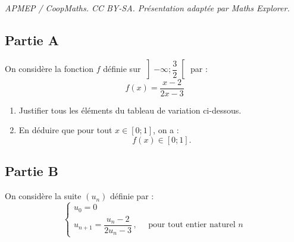\documentclass[10pt]{article}
\begin{document}
\noindent\textit{APMEP / CoopMaths. CC BY-SA. Présentation adaptée par Maths Explorer.}\par\medskip
\subsection*{Partie  A}
On considère la fonction $f$ définie sur $\left]-\infty ; \dfrac{3}{2}\right [$ par : \[f(x)=\dfrac{x-2}{2 x-3}\]

	\begin{enumerate}
		\item Justifier tous les éléments du tableau de variation ci-dessous.
	\end{enumerate}

	\begin{center}
	\end{center}

	\begin{enumerate}
		\setcounter{enumi}{1}
		\item En déduire que pour tout $x \in[0 ; 1]$, on a :
		\[f(x) \in[0 ; 1].\]
	\end{enumerate}

\subsection*{Partie  B}
On considère la suite $(u_{n})$ définie par :
\[\begin{cases}
	u_{0}=0 \\
	u_{n+1}=\dfrac{u_{n}-2}{2 u_{n}-3}\, ,\quad \text { pour tout entier naturel } n
\end{cases}\]
\end{document}
